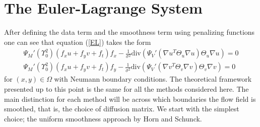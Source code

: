 \section{The Euler-Lagrange System}
After defining the data term and the smoothness term using penalizing functions one can see that equation (\ref{EL}) takes the form
\begin{equation}
\label{EL_regu}
\begin{aligned}
\Psi_M'(\Upsilon_0^2)(f_xu+f_yv + f_t)f_x - \frac{1}{\sigma^2} \text{div} \left(\Psi_V'(\nabla u^T \Theta_u \nabla u)  \Theta_u \nabla u \right) = 0 \\
\Psi_M'(\Upsilon_0^2)(f_xu+f_yv + f_t)f_y - \frac{1}{\sigma^2} \text{div} \left(\Psi_V'(\nabla v^T \Theta_v \nabla v)  \Theta_v \nabla v \right) = 0
\end{aligned}
\end{equation}
for $(x,y) \in \Omega$ with Neumann boundary conditions. The theoretical framework presented up to this point is the same for all the methods considered here. The main distinction for each method will be across which boundaries the flow field is smoothed, that is, the choice of diffusion matrix. We start with the simplest choice; the uniform smoothness approach by Horn and Schunck.
